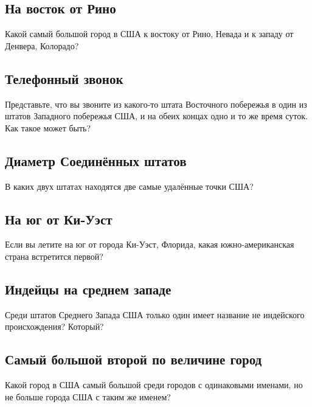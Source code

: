\subsection*{На восток от Рино}%

Какой самый большой город в США к востоку от Рино, Невада и к западу от Денвера, Колорадо? 

\subsection*{Телефонный звонок}%

Представьте, что вы звоните из какого-то штата Восточного побережья в один из штатов Западного побережья США, и на обеих концах одно и то же время суток.
Как такое может быть? 
  

\subsection*{Диаметр Соединённых штатов}%

В каких двух штатах находятся две самые удалённые точки США? 
  

\subsection*{На юг от Ки-Уэст}%

Если вы летите на юг от города Ки-Уэст, Флорида, какая южно-американская страна 
встретится первой? 

\subsection*{Индейцы на среднем западе}%

Среди штатов Среднего Запада США только один имеет название не индейского происхождения? Который?    

\subsection*{Самый большой второй по величине город}%

Какой город в США самый большой среди городов с одинаковыми именами, но не больше города США с таким же именем?

